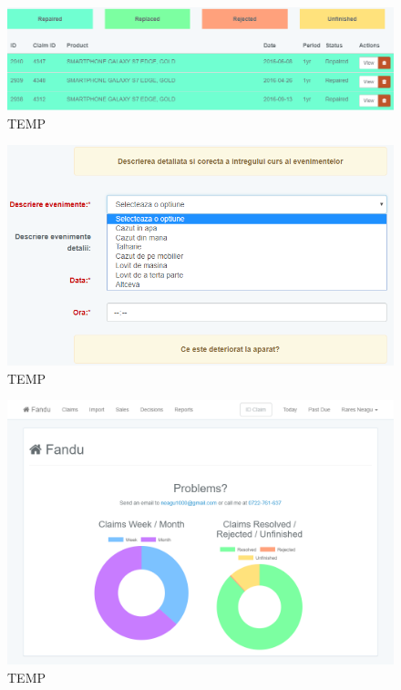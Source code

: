 	\begin{figure}
		\includegraphics[width=\linewidth]{../imagini/decisions_filter.png}
		\caption{TEMP}
		\label{fig:TEMP}
	\end{figure}
	\begin{figure}
		\includegraphics[width=\linewidth]{../imagini/descriere_eveniment.png}
		\caption{TEMP}
		\label{fig:TEMP}
	\end{figure}
	\begin{figure}
		\includegraphics[width=\linewidth]{../imagini/home_page.png}
		\caption{TEMP}
		\label{fig:TEMP}
	\end{figure}
